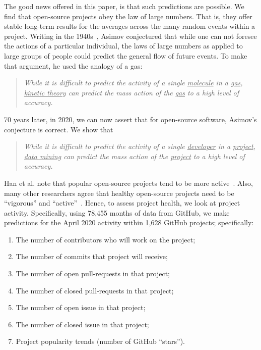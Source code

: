 \documentclass[sigconf,review,anonymous]{acmart}
\begin{document}
The good news offered in  this paper, is that such predictions are possible.
We find that open-source projects obey the law of large numbers.
That is, they offer   stable long-term results for the averages across the many random events within a project.
 Writing in the 1940s~\cite{asimov50},  Asimov conjectured that while one can not foresee the actions of a particular individual, the laws of large numbers as applied to large groups of people could predict the general flow of future events. To make that argument, he
 used the analogy of a gas: 
 \begin{quote}
 {\em  While it is  difficult to  predict the activity of a
 single 
 \underline{molecule} in a 
 \underline{gas},       \underline{kinetic theory} can predict the mass action of the \underline{ gas} to a high level of accuracy. }
 \end{quote}
 70 years later, in 2020, we can now assert that for open-source software,  Asimov's conjecture is correct. We  show that
 \begin{quote}
 {\em While it is  difficult to  predict the  activity of a single \underline{developer} in a \underline{project}, 
    \underline{data mining} can predict the mass action of 
 the \underline{project} to a high level of accuracy.}
 \end{quote}
 Han et al. note
 that popular open-source projects tend to be more active~\cite{han2019characterization}. Also, many other researchers agree that healthy open-source projects need to be ``vigorous'' and ``active''~\cite{wahyudin2007monitoring,jansen2014measuring,manikas2013reviewing,link2018assessing,wynn2007assessing,crowston2006assessing}.  Hence, to assess project health, we look at project activity.
Specifically,  using  78,455 months of data from  GitHub,  we make predictions for the   April 2020 activity within 1,628 GitHub projects;  specifically: 
 \begin{enumerate}
 \item The number of contributors who will work on the project; 
 \item The number of commits that project will receive;
 \item The number of open pull-requests in that project;
 \item The number of closed pull-requests in that project;
  \item The number of open issue in that project;
 \item The number of closed issue in that project;
 \item Project popularity trends (number of GitHub ``stars'').
 \end{enumerate}
 
\end{document}
